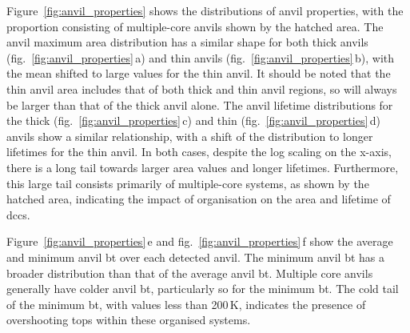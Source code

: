 Figure~\ref{fig:anvil_properties} shows the distributions of anvil properties, with the proportion consisting of multiple-core anvils shown by the hatched area.
The anvil maximum area distribution has a similar shape for both thick anvils (fig.~\ref{fig:anvil_properties}\,a) and thin anvils (fig.~\ref{fig:anvil_properties}\,b), with the mean shifted to large values for the thin anvil.
It should be noted that the thin anvil area includes that of both thick and thin anvil regions, so will always be larger than that of the thick anvil alone.
The anvil lifetime distributions for the thick (fig.~\ref{fig:anvil_properties}\,c) and thin (fig.~\ref{fig:anvil_properties}\,d) anvils show a similar relationship, with a shift of the distribution to longer lifetimes for the thin anvil.
In both cases, despite the log scaling on the x-axis, there is a long tail towards larger area values and longer lifetimes.
Furthermore, this large tail consists primarily of multiple-core systems, as shown by the hatched area, indicating the impact of organisation on the area and lifetime of \acrshort{dcc}s.

Figure~\ref{fig:anvil_properties}\,e and fig.~\ref{fig:anvil_properties}\,f show the average and minimum anvil \acrshort{bt} over each detected anvil.
The minimum anvil \acrshort{bt} has a broader distribution than that of the average anvil \acrshort{bt}.
Multiple core anvils generally have colder anvil \acrshort{bt}, particularly so for the minimum \acrshort{bt}.
The cold tail of the minimum \acrshort{bt}, with values less than 200\,\unit{K}, indicates the presence of overshooting tops within these organised systems.

